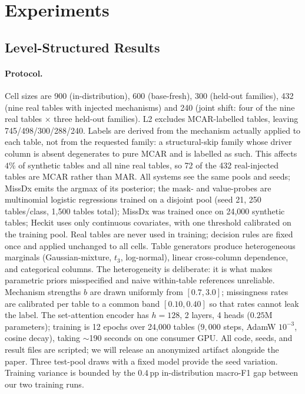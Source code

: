 \documentclass[conference]{IEEEtran}
\begin{document}
\section{Experiments}\label{sec:exp}
\subsection{Level-Structured Results}\label{sec:exp-levels}

\paragraph{Protocol.} Cell sizes are 900 (in-distribution), 600 (base-fresh), 300 (held-out
families), 432 (nine real tables with injected mechanisms) and 240 (joint shift: four of the
nine real tables $\times$ three held-out families). L2 excludes MCAR-labelled tables, leaving
745/498/300/288/240. Labels are derived from the mechanism actually applied to each table, not
from the requested family: a structural-skip family whose driver column is absent degenerates to
pure MCAR and is labelled as such. This affects $4\%$ of synthetic tables and all nine real
tables, so 72 of the 432 real-injected tables are MCAR rather than MAR. All systems see the same pools and seeds; MissDx emits the argmax of its posterior; the
mask- and value-probes are multinomial logistic regressions trained on a disjoint pool (seed 21,
250 tables/class, 1{,}500 tables total); MissDx was trained once on 24{,}000 synthetic tables;
Heckit uses only continuous covariates, with one threshold calibrated on the training pool. Real
tables are never used in training; decision rules are fixed once and applied unchanged to all
cells. Table generators produce heterogeneous marginals (Gaussian-mixture, $t_3$,
log-normal), linear cross-column dependence, and categorical columns. The heterogeneity is
deliberate: it is what makes parametric priors misspecified and naive within-table references
unreliable. Mechanism strengths $b$ are drawn uniformly from $[0.7,3.0]$; missingness rates
are calibrated per table to a common band $[0.10,0.40]$ so that rates cannot leak the label.
The set-attention encoder has $h{=}128$, 2 layers, 4 heads ($0.25$M parameters); training is
12 epochs over 24{,}000 tables ($9{,}000$ steps, AdamW $10^{-3}$, cosine decay), taking
$\sim$190 seconds on one consumer GPU. All code, seeds, and result files are scripted;
we will release an anonymized artifact alongside the paper.
Three test-pool draws with a fixed model provide the seed variation. Training variance is
bounded by the $0.4$\,pp in-distribution macro-F1 gap between our two training runs.
\end{document}
